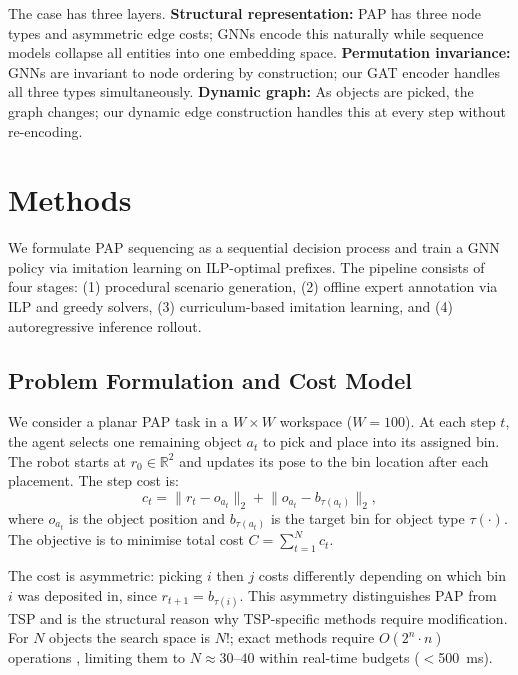 \documentclass[conference]{IEEEtran}
\begin{document}
The case has three layers. \textbf{Structural representation:} PAP has three node types and asymmetric edge costs; GNNs encode this naturally while sequence models collapse all entities into one embedding space. \textbf{Permutation invariance:} GNNs are invariant to node ordering by construction; our GAT encoder handles all three types simultaneously. \textbf{Dynamic graph:} As objects are picked, the graph changes; our dynamic edge construction handles this at every step without re-encoding.

\section{Methods}\label{sec:methods}

We formulate PAP sequencing as a sequential decision process and train a GNN policy via imitation learning on ILP-optimal prefixes. The pipeline consists of four stages: (1) procedural scenario generation, (2) offline expert annotation via ILP and greedy solvers, (3) curriculum-based imitation learning, and (4) autoregressive inference rollout.

\subsection{Problem Formulation and Cost Model}

We consider a planar PAP task in a $W \times W$ workspace ($W=100$). At each step $t$, the agent selects one remaining object $a_t$ to pick and place into its assigned bin. The robot starts at $r_0 \in \mathbb{R}^2$ and updates its pose to the bin location after each placement. The step cost is:
\begin{equation}
c_t = \lVert r_t - o_{a_t} \rVert_2 + \lVert o_{a_t} - b_{\tau(a_t)} \rVert_2,
\end{equation}
where $o_{a_t}$ is the object position and $b_{\tau(a_t)}$ is the target bin for object type $\tau(\cdot)$. The objective is to minimise total cost $C = \sum_{t=1}^{N} c_t$.

The cost is asymmetric: picking $i$ then $j$ costs differently depending on which bin $i$ was deposited in, since $r_{t+1} = b_{\tau(i)}$. This asymmetry distinguishes PAP from TSP and is the structural reason why TSP-specific methods require modification. For $N$ objects the search space is $N!$; exact methods require $O(2^n \cdot n)$ operations \cite{han2019pap}, limiting them to $N \approx 30$--$40$ within real-time budgets ($<$500~ms).
\end{document}

